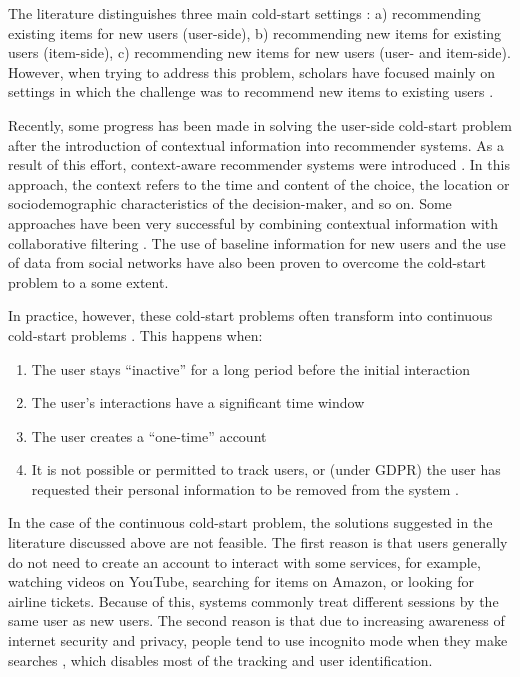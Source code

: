 \documentclass[a4paper,12pt]{article}
\begin{document}
The literature distinguishes three main cold-start settings \citep{park2009pairwise}: a) recommending existing items for new users (user-side), b) recommending new items for existing users (item-side), c) recommending new items for new users (user- and item-side). However, when trying to address this problem, scholars have focused mainly on settings in which the challenge was to recommend new items to existing users \citep{zhang2010solving}.

Recently, some progress has been made in solving the user-side cold-start problem after the introduction of contextual information into recommender systems. As a result of this effort, context-aware recommender systems were introduced \citep{adomavicius2011context}. In this approach, the context refers to the time and content of the choice, the location or sociodemographic characteristics of the decision-maker, and so on.  Some approaches have been very successful by combining contextual information with collaborative filtering \citep{aharon2013off,bykau2013coping,saveski2014item}. The use of baseline information for new users \citep{kluver2014evaluating} and the use of data from social networks \citep{guy2009personalized} have also been proven to overcome the cold-start problem to a some extent.

In practice, however, these cold-start problems often transform into continuous cold-start problems \citep{kiseleva2016beyond}. This happens when:
\begin{enumerate}
    \item The user stays ``inactive'' for a long period before the initial interaction
    \item The user's interactions have a significant time window
    \item The user creates a ``one-time'' account
    \item It is not possible or permitted to track users, or (under GDPR) the user has requested their personal information to be removed from the system \citep{hildebrandt2022issue}.
\end{enumerate}

In the case of the continuous cold-start problem, the solutions suggested in the literature discussed above are not feasible. The first reason is that users generally do not need to create an account to interact with some services, for example,  watching videos on YouTube, searching for items on Amazon, or looking for airline tickets. Because of this, systems commonly treat different sessions by the same user as new users. The second reason is that due to increasing awareness of internet security and privacy, people tend to use incognito mode when they make searches \citep{anton2010internet}, which disables most of the tracking and user identification.
\end{document}
